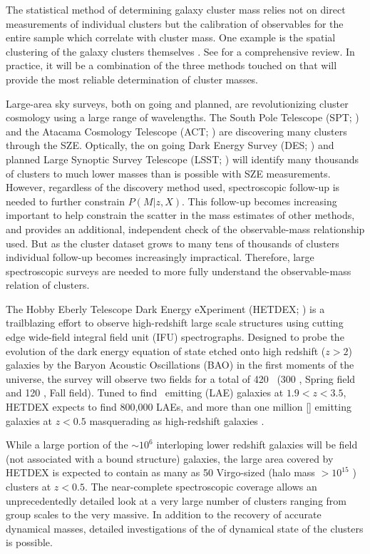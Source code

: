 \documentclass[fleqn,usenatbib]{mnras}
\begin{document}
The statistical method of determining galaxy cluster mass relies not on direct measurements of individual clusters but the calibration of observables for the entire sample which correlate with cluster mass. One example is the spatial clustering of the galaxy clusters themselves . See \cite{Weinberg2013} for a comprehensive review. In practice, it will be a combination of the three methods touched on that will provide the most reliable determination of cluster masses.

Large-area sky surveys, both on going and planned, are revolutionizing cluster cosmology using a large range of wavelengths. The South Pole Telescope (SPT; \citealt{Carlstrom2011}) and the Atacama Cosmology Telescope (ACT; \citealt{Swetz2011}) are discovering many clusters through the SZE. Optically, the on going Dark Energy Survey (DES; \citealt{DES2005}) and planned Large Synoptic Survey Telescope (LSST; \citealt{LSST2012}) will identify many thousands of clusters to much lower masses than is possible with SZE measurements. However, regardless of the discovery method used, spectroscopic follow-up is needed to further constrain $P(M|z,X)$. This follow-up becomes increasing important to help constrain the scatter in the mass estimates of other methods, and provides an additional, independent check of the observable-mass relationship used. But as the cluster dataset grows to many tens of thousands of clusters individual follow-up becomes increasingly impractical. Therefore, large spectroscopic surveys are needed to more fully understand the observable-mass relation of clusters.

The Hobby Eberly Telescope Dark Energy eXperiment (HETDEX; \citealt{Hill2008}) is a trailblazing effort to observe high-redshift large scale structures using cutting edge wide-field integral field unit (IFU) spectrographs. Designed to probe the evolution of the dark energy equation of state etched onto high redshift ($z>2$) galaxies by the Baryon Acoustic Oscillations (BAO) \citep{Eisenstein2005} in the first moments of the universe, the survey will observe two fields for a total of 420 \degsq\ (300 \degsq, Spring field and 120 \degsq, Fall field). Tuned to find \lya\ emitting (LAE) galaxies at $1.9<z<3.5$, HETDEX expects to find 800,000 LAEs, and more than one million \hbox{[]} emitting galaxies at $z<0.5$ masquerading as high-redshift galaxies \citep{Acquaviva2014}. 

While a large portion of the $\sim10^6$ interloping lower redshift galaxies will be field (not associated with a bound structure) galaxies, the large area covered by HETDEX is expected to contain as many as 50 Virgo-sized (halo mass $>10^{15}$ \msol) clusters at $z<0.5$. The near-complete spectroscopic coverage allows an unprecedentedly detailed look at a very large number of clusters ranging from group scales to the very massive. In addition to the recovery of accurate dynamical masses, detailed investigations of the of dynamical state of the clusters is possible. 
\end{document}
